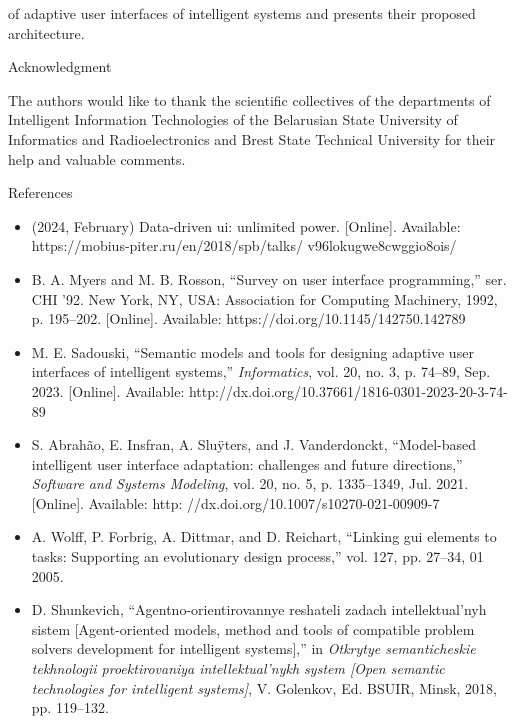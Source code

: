 \documentclass{article}
\begin{document}
\begin{multicols}{2}
 \noindent of adaptive user interfaces of intelligent systems and
presents their proposed architecture.
\begin{center}
Acknowledgment
\end{center}
The authors would like to thank the scientific collectives of the departments of Intelligent Information Technologies of the Belarusian State University of Informatics
and Radioelectronics and Brest State Technical University
for their help and valuable comments.
\begin{center}
References
\end{center}

\begin{itemize}
   \small\renewcommand{\labelitemi}{ [1]}
\item (2024, February) Data-driven ui: unlimited power.
[Online]. Available: https://mobius-piter.ru/en/2018/spb/talks/
v96lokugwe8cwggio8ois/
\renewcommand{\labelitemi}{ [2]}
\item B. A. Myers and M. B. Rosson, “Survey on user interface
programming,” ser. CHI ’92. New York, NY, USA: Association
for Computing Machinery, 1992, p. 195–202. [Online]. Available:
https://doi.org/10.1145/142750.142789

\renewcommand{\labelitemi}{ [3]}
\item M. E. Sadouski, “Semantic models and tools for designing
adaptive user interfaces of intelligent systems,” \textit{Informatics},
vol. 20, no. 3, p. 74–89, Sep. 2023. [Online]. Available:
http://dx.doi.org/10.37661/1816-0301-2023-20-3-74-89

\renewcommand{\labelitemi}{ [4]}
\item S. Abrahão, E. Insfran, A. Sluÿters, and J. Vanderdonckt,
“Model-based intelligent user interface adaptation: challenges
and future directions,” \textit{Software and Systems Modeling}, vol. 20,
no. 5, p. 1335–1349, Jul. 2021. [Online]. Available: http:
//dx.doi.org/10.1007/s10270-021-00909-7

\renewcommand{\labelitemi}{ [5]}
\item A. Wolff, P. Forbrig, A. Dittmar, and D. Reichart, “Linking gui
elements to tasks: Supporting an evolutionary design process,”
vol. 127, pp. 27–34, 01 2005.

\renewcommand{\labelitemi}{ [6]}
\item D. Shunkevich, “Agentno-orientirovannye reshateli zadach
intellektual’nyh sistem [Agent-oriented models, method and
tools of compatible problem solvers development for intelligent
systems],” in \textit{Otkrytye semanticheskie tekhnologii proektirovaniya
intellektual’nykh system [Open semantic technologies for
intelligent systems]}, V. Golenkov, Ed. BSUIR, Minsk, 2018, pp.
119–132.


\end{itemize}
\end{multicols}
\end{document}
